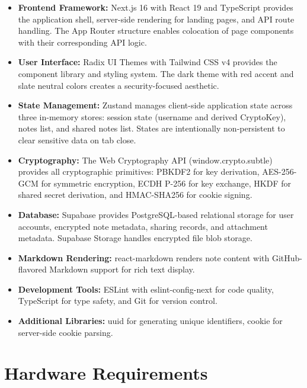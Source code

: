 \begin{itemize}
    \item \textbf{Frontend Framework:} Next.js 16 with React 19 and TypeScript provides the application shell, server-side rendering for landing pages, and API route handling. The App Router structure enables colocation of page components with their corresponding API logic.

    \item \textbf{User Interface:} Radix UI Themes with Tailwind CSS v4 provides the component library and styling system. The dark theme with red accent and slate neutral colors creates a security-focused aesthetic.

    \item \textbf{State Management:} Zustand manages client-side application state across three in-memory stores: session state (username and derived CryptoKey), notes list, and shared notes list. States are intentionally non-persistent to clear sensitive data on tab close.

    \item \textbf{Cryptography:} The Web Cryptography API (window.crypto.subtle) provides all cryptographic primitives: PBKDF2 for key derivation, AES-256-GCM for symmetric encryption, ECDH P-256 for key exchange, HKDF for shared secret derivation, and HMAC-SHA256 for cookie signing.

    \item \textbf{Database:} Supabase provides PostgreSQL-based relational storage for user accounts, encrypted note metadata, sharing records, and attachment metadata. Supabase Storage handles encrypted file blob storage.

    \item \textbf{Markdown Rendering:} react-markdown renders note content with GitHub-flavored Markdown support for rich text display.

    \item \textbf{Development Tools:} ESLint with eslint-config-next for code quality, TypeScript for type safety, and Git for version control.

    \item \textbf{Additional Libraries:} uuid for generating unique identifiers, cookie for server-side cookie parsing.
\end{itemize}

\section{Hardware Requirements}

